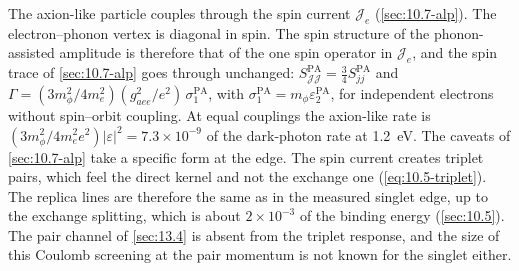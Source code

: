 The axion-like particle couples through the spin current $\mathcal{J}_e$ (\cref{sec:10.7-alp}). The electron--phonon vertex is diagonal in spin. The spin structure of the phonon-assisted amplitude is therefore that of the one spin operator in $\mathcal{J}_e$, and the spin trace of \cref{sec:10.7-alp} goes through unchanged: $S^{\mathrm{PA}}_{\mathcal{J}\mathcal{J}} = \frac34S^{\mathrm{PA}}_{jj}$ and $\varGamma = (3m_\phi^2/4m_e^2)(g_{aee}^2/e^2)\,\sigma_1^{\mathrm{PA}}$, with $\sigma_1^{\mathrm{PA}} = m_\phi\varepsilon_2^{\mathrm{PA}}$, for independent electrons without spin--orbit coupling. At equal couplings the axion-like rate is $(3m_\phi^2/4m_e^2e^2)|\varepsilon|^2 = 7.3\times10^{-9}$ of the dark-photon rate at \SI{1.2}{eV}. The caveats of \cref{sec:10.7-alp} take a specific form at the edge. The spin current creates triplet pairs, which feel the direct kernel and not the exchange one (\cref{eq:10.5-triplet}). The replica lines are therefore the same as in the measured singlet edge, up to the exchange splitting, which is about $2\times10^{-3}$ of the binding energy (\cref{sec:10.5}). The pair channel of \cref{sec:13.4} is absent from the triplet response, and the size of this Coulomb screening at the pair momentum is not known for the singlet either.

